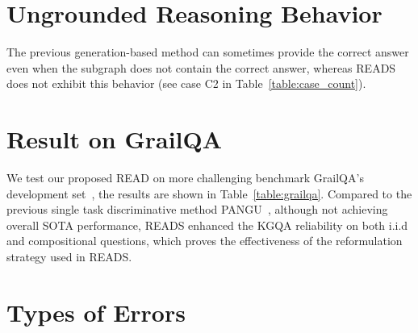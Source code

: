 \documentclass[11pt]{article}
\begin{document}
\begin{table}[]
\centering
{}
\caption{The Hits@1 performance on GrailQA.}
\label{table:grailqa}
\end{table}

\section{Ungrounded Reasoning Behavior}
\label{sec:appendix_D}
The previous generation-based method can sometimes provide the correct answer even when the subgraph does not contain the correct answer, whereas READS does not exhibit this behavior (see case C2 in Table~\ref{table:case_count}).

\section{Result on GrailQA}
\label{sec:grailqa}

We test our proposed READ on more challenging benchmark GrailQA's development set~\cite{gu2021beyond}, the results are shown in Table~\ref{table:grailqa}. Compared to the previous single task discriminative method PANGU~\cite{gu2023don}, although not achieving overall SOTA performance, READS enhanced the KGQA reliability on both i.i.d and compositional questions, which proves the effectiveness of the reformulation strategy used in READS.

\section{Types of Errors}
\label{sec:appendix_error}
\end{document}
